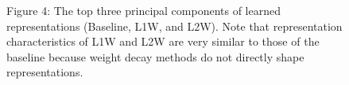 \begin{figure}[htbp]
    \qquad\qquad\qquad
     
    \captionsetup{labelformat=empty}
\caption{Figure 4: The top three principal components of learned representations (Baseline, L1W, and L2W). Note that representation characteristics of L1W and L2W are very similar to those of the baseline because weight decay methods do not directly shape representations.}%
    \label{fig:pca_1}%
\end{figure}

